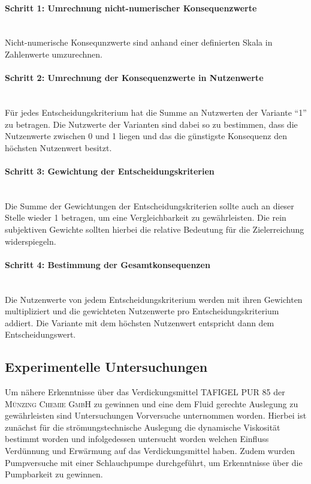 \paragraph{Schritt 1: Umrechnung nicht-numerischer Konsequenzwerte}	\, \\
Nicht-numerische Konsequnzwerte sind anhand einer definierten Skala in Zahlenwerte umzurechnen.
\vspace*{-2.5mm}
\paragraph{Schritt 2: Umrechnung der Konsequenzwerte in Nutzenwerte} \, \\ 
Für jedes Entscheidungskriterium hat die Summe an Nutzwerten der Variante "`1"' zu betragen. Die Nutzwerte der Varianten sind dabei so zu bestimmen, dass die Nutzenwerte zwischen $0$ und 1 liegen und das die günstigste Konsequenz den höchsten Nutzenwert besitzt.
\vspace*{-2.5mm}
\paragraph{Schritt 3: Gewichtung der Entscheidungskriterien} \, \\
Die Summe der Gewichtungen der Entscheidungskriterien sollte auch an dieser Stelle wieder 1 betragen, um eine Vergleichbarkeit zu gewährleisten. Die rein subjektiven Gewichte sollten hierbei die relative Bedeutung für die Zielerreichung widerspiegeln.
\vspace*{-7.5mm}
\paragraph{Schritt 4: Bestimmung der Gesamtkonsequenzen} \, \\
Die Nutzenwerte von jedem Entscheidungskriterium werden mit ihren Gewichten multipliziert und die gewichteten Nutzenwerte pro Entscheidungskriterium addiert. Die Variante mit dem höchsten Nutzenwert entspricht dann dem Entscheidungswert.


\subsection{Experimentelle Untersuchungen}
Um nähere Erkenntnisse über das Verdickungsmittel TAFIGEL PUR 85 der \textsc{Münzing Chemie GmbH} zu gewinnen und eine dem Fluid gerechte Auslegung zu gewährleisten sind Untersuchungen Vorversuche unternommen worden. Hierbei ist zunächst für die strömungstechnische Auslegung die dynamische Viskosität bestimmt worden und infolgedessen untersucht worden welchen Einfluss Verdünnung und Erwärmung auf das Verdickungsmittel haben. Zudem wurden Pumpversuche mit einer Schlauchpumpe durchgeführt, um Erkenntnisse über die Pumpbarkeit zu gewinnen.

